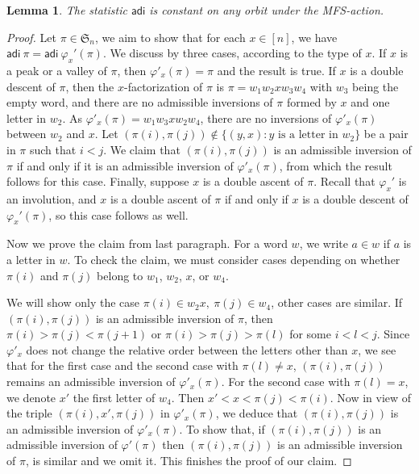 \documentclass[12pt,reqno]{amsart}
\numberwithin{equation}{section}
\theoremstyle{plain}
\newtheorem{lemma}[theorem]{Lemma}
\theoremstyle{definition}
\def\S{\mathfrak{S}}
\def\ai{\mathsf{adi}}
\begin{document}
\begin{lemma}\label{lemact}
The statistic $\ai$ is constant on any orbit under the MFS-action.
\end{lemma}
\begin{proof}
Let $\pi\in\S_n$, we aim to show that for each $x\in [n]$, we have $\ai\:\pi=\ai\:\varphi_x'(\pi)$. We discuss by three cases, according to the type of $x$. If $x$ is a peak or a valley of $\pi$, then $\varphi'_x(\pi)=\pi$ and the result is true. If $x$ is a double descent of $\pi$, then the $x$-factorization of $\pi$ is $\pi=w_1w_2xw_3w_4$ with $w_3$ being the empty word, and there are no admissible inversions of $\pi$ formed by $x$ and one letter in $w_2$. As $\varphi'_x(\pi)=w_1w_3xw_2w_4$, there are no inversions of $\varphi'_x(\pi)$ between $w_2$ and $x$. Let $(\pi(i),\pi(j))\notin\{(y, x) : \text{$y$ is a letter in $w_2$}\}$ be a pair in $\pi$ such that $i<j$. We claim that $(\pi(i),\pi(j))$ is an admissible inversion of $\pi$ if and only if it is an  admissible inversion of $\varphi'_x(\pi)$, from which the result follows for this case. Finally, suppose $x$ is a double ascent of $\pi$. Recall that $\varphi_x'$ is an involution, and $x$ is a double ascent of $\pi$ if and only if $x$ is a double descent of $\varphi_x'(\pi)$, so this case follows as well.

Now we prove the claim from last paragraph. For a word $w$, we write $a\in w$ if $a$ is a letter in $w$. To check the claim, we must consider cases depending on whether $\pi(i)$ and $\pi(j)$ belong to $w_1$, $w_2$, $x$, or $w_4$.






 We will show only the case $\pi(i)\in w_2x, \:\pi(j)\in w_4$, other cases are similar. If $(\pi(i),\pi(j))$ is an admissible inversion of $\pi$, then $\pi(i)>\pi(j)<\pi(j+1)$ or $\pi(i)>\pi(j)>\pi(l)$ for some $i<l<j$. Since $\varphi'_x$ does not change the relative order between the letters other than $x$, we see that for the first case and the second case with $\pi(l)\ne x$, $(\pi(i),\pi(j))$ remains an admissible inversion of $\varphi'_x(\pi)$. For the second case with $\pi(l)=x$, we denote $x'$ the first letter of $w_4$. Then $x'<x<\pi(j)<\pi(i)$. Now in view of the triple $(\pi(i),x',\pi(j))$ in $\varphi'_x(\pi)$, we deduce that $(\pi(i),\pi(j))$ is an admissible inversion of $\varphi'_x(\pi)$. To show that, if $(\pi(i),\pi(j))$ is an admissible inversion of $\varphi'(\pi)$ then $(\pi(i),\pi(j))$ is an admissible inversion of $\pi$, is similar and we omit it. This finishes the proof of our claim.
\end{proof}
\end{document}
